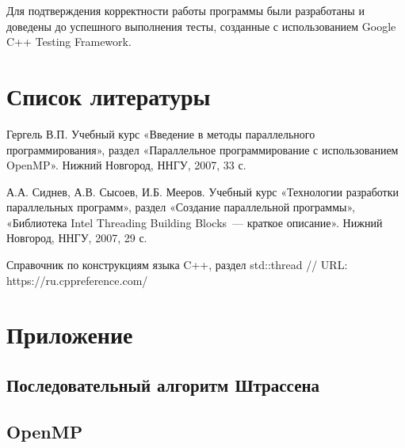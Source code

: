 \documentclass{article}
\begin{document}
\par Для подтверждения корректности работы программы были разработаны и доведены до успешного выполнения тесты, созданные с использованием Google C++ Testing Framework.

\newpage

\section{Список литературы}
\begin{enumerate}
 Гергель В.П. Учебный курс «Введение в методы параллельного программирования», раздел «Параллельное программирование с использованием OpenMP». Нижний Новгород, ННГУ, 2007, 33 с.

 А.А. Сиднев, А.В. Сысоев, И.Б. Мееров. Учебный курс «Технологии разработки параллельных программ», раздел «Создание параллельной программы», «Библиотека Intel Threading Building Blocks~--- краткое описание». Нижний Новгород, ННГУ, 2007, 29 с. 

 Справочник по конструкциям языка C++, раздел std::thread // URL: https://ru.cppreference.com/

\end{enumerate}

\newpage

\section{Приложение}

\subsection{Последовательный алгоритм Штрассена}





\subsection{OpenMP}




\end{document}
